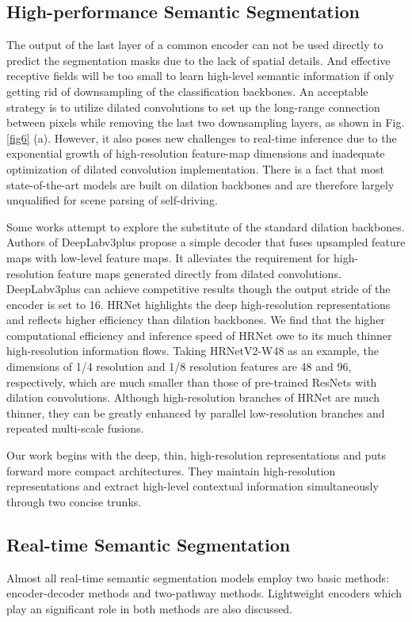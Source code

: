 \documentclass[journal]{IEEEtran}
\begin{document}
\subsection{High-performance Semantic Segmentation}

The output of the last layer of a common encoder can not be used directly to predict the segmentation masks due to the lack of spatial details. And effective receptive fields will be too small to learn high-level semantic information if only getting rid of downsampling of  the classification backbones. An acceptable strategy is to utilize dilated convolutions to set up the long-range connection between pixels while removing the last two downsampling layers\cite{chen2017rethinking,zhao2017pyramid}, as shown in Fig. \ref{fig6} (a). However, it also poses new challenges to real-time inference due to the exponential growth of high-resolution feature-map dimensions and inadequate optimization of dilated convolution implementation. There is a fact that most state-of-the-art models are built on dilation backbones and are therefore largely unqualified for scene parsing of self-driving.

Some works attempt to explore the substitute of the standard dilation backbones. Authors of DeepLabv3plus\cite{chen2018encoder} propose a simple decoder that fuses upsampled feature maps with low-level feature maps. It alleviates the requirement for high-resolution feature maps generated directly from dilated convolutions. DeepLabv3plus can achieve competitive results though the output stride of the encoder is set to 16. HRNet\cite{sun2019high} highlights the deep high-resolution representations and reflects higher efficiency than dilation backbones. We find that the higher computational efficiency and inference speed of HRNet owe to its much thinner high-resolution information flows. Taking HRNetV2-W48 as an example, the dimensions of 1/4 resolution and 1/8 resolution features are 48 and 96, respectively, which are much smaller than those of pre-trained ResNets\cite{he2016deep} with dilation convolutions. Although high-resolution branches of HRNet are much thinner, they can be greatly enhanced by parallel low-resolution branches and repeated multi-scale fusions.

Our work begins with the deep, thin, high-resolution representations and puts forward more compact architectures. They maintain high-resolution representations and extract high-level contextual information simultaneously through two concise trunks.

\subsection{Real-time Semantic Segmentation}
Almost all real-time semantic segmentation models employ two basic methods: encoder-decoder methods and two-pathway methods. Lightweight encoders which play an significant role in both methods are also discussed.
\end{document}
